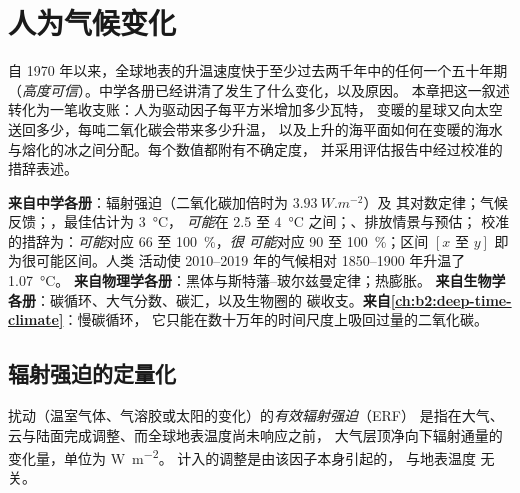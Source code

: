 \chapter{人为气候变化}\label{ch:b2:anthropogenic-climate-change}

自 1970 年以来，全球地表的升温速度快于至少过去两千年中的任何一个五十年期
（\emph{高度可信}）。中学各册已经讲清了发生了什么变化，以及原因。
本章把这一叙述转化为一笔收支账：人为驱动因子每平方米增加多少瓦特，
变暖的星球又向太空送回多少，每吨二氧化碳会带来多少升温，
以及上升的海平面如何在变暖的海水与熔化的冰之间分配。每个数值都附有不确定度，
并采用评估报告中经过校准的措辞表述。

\begin{recall}
\textbf{来自中学各册}：辐射强迫（二氧化碳加倍时为 $\qty{3.93}{W.m^{-2}}$）及
其对数定律；气候反馈；，最佳估计为 \qty{3}{\celsius}，
\emph{可能}在 2.5 至 \qty{4}{\celsius} 之间；、排放情景与预估；
校准的措辞为：\emph{可能}对应 66 至 \qty{100}{\percent}，\emph{很
可能}对应 90 至 \qty{100}{\percent}；区间 $[x \text{ 至 } y]$ 即为很可能区间。人类
活动使 2010--2019 年的气候相对 1850--1900 年升温了 \qty{1.07}{\celsius}。
\textbf{来自物理学各册}：黑体与斯特藩–玻尔兹曼定律；热膨胀。
\textbf{来自生物学各册}：碳循环、大气分数、碳汇，以及生物圈的
碳收支。\textbf{来自\cref{ch:b2:deep-time-climate}}：慢碳循环，
它只能在数十万年的时间尺度上吸回过量的二氧化碳。
\end{recall}

\section{辐射强迫的定量化}\label{sec:b2:anthropogenic-climate-change:forcing}

\begin{definition}[有效辐射强迫]\label{def:b2:anthropogenic-climate-change:erf}
扰动（温室气体、气溶胶或太阳的变化）的\emph{有效辐射强迫}（ERF）
是指在大气、云与陆面完成调整、而全球地表温度尚未响应之前，
大气层顶净向下辐射通量的变化量，单位为 \unit{W.m^{-2}}。
计入的调整是由该因子本身引起的，
与地表温度
无关。
\end{definition}

